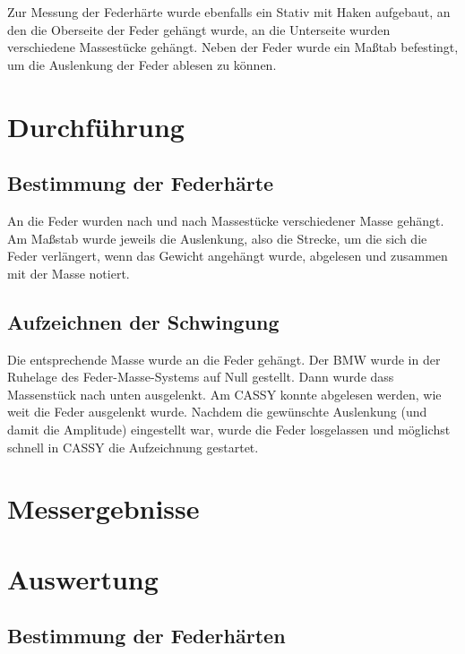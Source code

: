 Zur Messung der Federhärte wurde ebenfalls ein Stativ mit Haken aufgebaut, an den die Oberseite der Feder gehängt wurde, an die Unterseite wurden verschiedene Massestücke gehängt. Neben der Feder wurde ein Maßtab befestingt, um die Auslenkung der Feder ablesen zu können.


\section{Durchführung}
\subsection{Bestimmung der Federhärte}
An die Feder wurden nach und nach Massestücke verschiedener Masse gehängt. Am Maßstab wurde jeweils die Auslenkung, also die Strecke, um die sich die Feder verlängert, wenn das Gewicht angehängt wurde, abgelesen und zusammen mit der Masse notiert.

\subsection{Aufzeichnen der Schwingung}
Die entsprechende Masse wurde an die Feder gehängt. Der BMW wurde in der Ruhelage des Feder-Masse-Systems auf Null gestellt. Dann wurde dass Massenstück nach unten ausgelenkt. Am CASSY konnte abgelesen werden, wie weit die Feder ausgelenkt wurde. Nachdem die gewünschte Auslenkung (und damit die Amplitude) eingestellt war, wurde die Feder losgelassen und möglichst schnell in CASSY die Aufzeichnung gestartet.

\section{Messergebnisse}

\section{Auswertung}
\subsection{Bestimmung der Federhärten}

